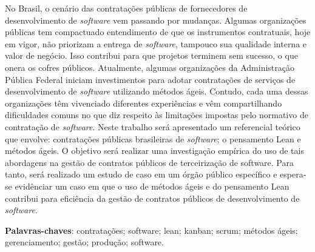 \begin{resumo}
No Brasil, o cenário das contratações públicas de fornecedores de desenvolvimento de \textit{software} vem passando por mudanças. Algumas organizações públicas tem compactuado entendimento de que os instrumentos contratuais, hoje em vigor, não priorizam a entrega de \textit{software}, tampouco sua qualidade interna e valor de negócio. Isso contribui para que projetos terminem sem sucesso, o que onera os cofres públicos. Atualmente, algumas organizações da Administração Pública Federal iniciam investimentos para adotar contratações de serviços de desenvolvimento de \textit{software} utilizando métodos ágeis. Contudo, cada uma dessas organizações têm vivenciado diferentes experiências e vêm compartilhando dificuldades comuns no que diz respeito às limitações impostas pelo normativo de contratação de \textit{software}. Neste trabalho será apresentado um referencial teórico que envolve: contratações públicas brasileiras de \textit{software}; o pensamento Lean e métodos ágeis. O objetivo será realizar uma investigação empírica do uso de tais abordagens na gestão de contratos públicos de terceirização de software. Para tanto, será realizado um estudo de caso em um órgão público específico e espera-se evidênciar um caso em que o uso de métodos ágeis e do pensamento Lean contribui para eficiência da gestão de contratos públicos de desenvolvimento de \textit{software}.

\vspace{\onelineskip}
    
 \noindent
 \textbf{Palavras-chaves}: contratações; software; lean; kanban; scrum; métodos ágeis; gerenciamento; gestão; produção; software.
\end{resumo}
